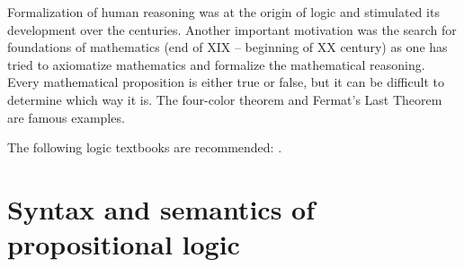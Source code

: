 \begin{page}
Formalization of human reasoning was at the origin of logic and stimulated its development over the centuries.
Another important motivation was the search for foundations of mathematics (end of XIX -- beginning of XX century)
as one has tried to axiomatize mathematics and formalize the mathematical reasoning.
Every mathematical proposition is either true or false, but it can be difficult to determine which way it is.
The four-color theorem and Fermat's Last Theorem are famous examples.

The following logic textbooks are recommended: \cite{Gallier, CL1, CL2, Dalen}.




\end{page}

\begin{page}
\setcounter{section}{1}
\setcounter{subsection}{1}
\setcounter{dfn}{0}
\label{portion:402}

\section{Syntax and semantics of propositional logic}

\end{page}

